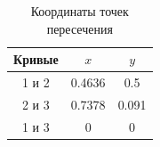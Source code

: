 \documentclass[a4paper,12pt,titlepage,finall]{article}
\begin{document}
\begin{table}[h]
\centering
\begin{tabular}{|c|c|c|}
\hline
Кривые & $x$ & $y$ \\
\hline
1 и 2 &  0.4636 & 0.5 \\
2 и 3 &  0.7378 & 0.091 \\
1 и 3 & 0 & 0 \\
\hline
\end{tabular}
\caption{Координаты точек пересечения}
\label{table1}
\end{table}
\end{document}
